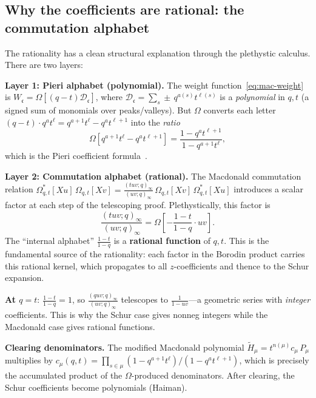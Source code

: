 \documentclass[11pt]{article}
\theoremstyle{plain}
\theoremstyle{definition}
\theoremstyle{remark}
\begin{document}
\subsection{Why the coefficients are rational: the commutation alphabet}
\label{sec:mac-why-rational}

The rationality has a clean structural explanation through
the plethystic calculus. There are two layers:

\medskip\noindent\textbf{Layer 1: Pieri alphabet (polynomial).}
The weight function~\eqref{eq:mac-weight} is
$W_\mathfrak{c} = \Omega[(q-t)\mathcal{D}_\mathfrak{c}]$,
where $\mathcal{D}_\mathfrak{c} = \sum_s \pm\, q^{a(s)}t^{\ell(s)}$
is a \emph{polynomial} in $q,t$ (a signed sum of monomials over
peaks/valleys).  But $\Omega$ converts each letter
$(q-t)\cdot q^a t^\ell = q^{a+1}t^\ell - q^a t^{\ell+1}$
into the \emph{ratio}
\[
  \Omega[q^{a+1}t^\ell - q^a t^{\ell+1}]
  = \frac{1 - q^a t^{\ell+1}}{1 - q^{a+1} t^\ell},
\]
which is the Pieri coefficient formula~\cite{macdonald}.

\medskip\noindent\textbf{Layer 2: Commutation alphabet (rational).}
The Macdonald commutation relation
$\Omega^*_{q,t}[Xu]\, \Omega_{q,t}[Xv]
= \tfrac{(tuv;q)_\infty}{(uv;q)_\infty}\, \Omega_{q,t}[Xv]\,
\Omega^*_{q,t}[Xu]$
introduces a scalar factor at each step of the telescoping proof.
Plethystically, this factor is
\begin{equation}\label{eq:comm-alphabet}
  \frac{(tuv;q)_\infty}{(uv;q)_\infty}
  = \Omega\!\left[-\frac{1-t}{1-q}\cdot uv\right].
\end{equation}
The ``internal alphabet'' $\frac{1-t}{1-q}$ is a \textbf{rational
function} of $q,t$.  This is the fundamental source of the
rationality: each factor in the Borodin product carries this
rational kernel, which propagates to all $z$-coefficients
and thence to the Schur expansion.

\medskip\noindent\textbf{At $q = t$}: $\frac{1-t}{1-q} = 1$,
so $\frac{(quv;q)_\infty}{(uv;q)_\infty}$ telescopes to
$\frac{1}{1-uv}$---a geometric series with \emph{integer}
coefficients. This is why the Schur case gives nonneg integers
while the Macdonald case gives rational functions.

\medskip\noindent\textbf{Clearing denominators.}
The modified Macdonald polynomial $\tilde{H}_\mu = t^{n(\mu)} c_\mu\, P_\mu$
multiplies by $c_\mu(q,t) = \prod_{s \in \mu} (1 - q^{a+1}t^\ell) /
(1 - q^a t^{\ell+1})$, which is precisely the accumulated product of
the $\Omega$-produced denominators.
After clearing, the Schur coefficients become polynomials (Haiman).
\end{document}
